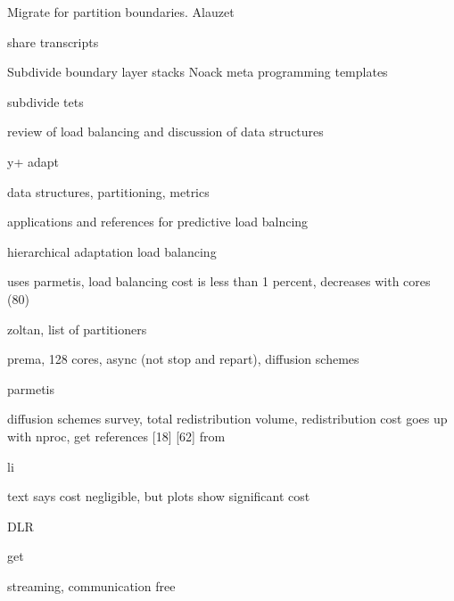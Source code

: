 \documentclass{article}
\begin{document}
Migrate for partition boundaries. 
Alauzet\cite{alauzet-li-seol-shephard-para-aniso}
\cite{kallinderis-load-balance}
\cite{lepage}
\cite{cavallo-para-adapt}
\cite{cavallo-phd-thesis}

share transcripts
\cite{park-darmofal-parallel-aniso-adapt-aiaa}
\cite{park-phd-thesis}

Subdivide boundary layer stacks
\cite{rpi-ec-2008-adapt-bl-visc}
\cite{kallinderis-adapt}
\cite{mavriplis-3d-adapt-mixed-subdivision}
\cite{lapage-habashi-3d-aniso-2002}
\cite{cavallo-phd-thesis}
\cite{kim-nakahashi-adjoint-adapt-viscous}
Noack meta programming templates\cite{noack-unstruct-mixed-adapt-template}

subdivide tets
\cite{rausch-unsteady-adaptation-3d}
\cite{waltz:2003}

review of load balancing and discussion of data structures
\cite{kallinderis-kavouklis-adapt-3d-hybrid,%
      kavouklis-kallinderis-parallel-3d-hybrid-adapt}

y+ adapt\cite{knopp-alrutz-schwambor-adapt-grid-wall-func-rans}

data structures, partitioning, metrics
\cite{flaherty-parallel-data-structures}

applications and references for predictive load balncing
\cite{dindar-shephard-flaherty-adapt-rotorcraft-tc-rotor}

hierarchical adaptation\cite{kallinderis-parallel}
load balancing\cite{minyard-kallinderis-load-balance}

uses parmetis, load balancing cost is less than 1 percent, decreases with cores (80)
\cite{eccomas-2010-para-perf-adapt}

zoltan, list of partitioners
\cite{devine-anm-2005-zoltan-load-balancing}

prema, 128 cores, async (not stop and repart), diffusion schemes
\cite{chrisochoides-ieee-tpds-2004-load-balance}

parmetis
\cite{parmetis-sc-2000}

diffusion schemes survey, total redistribution volume, redistribution cost goes up with nproc,
get references [18] [62] from
\cite{oliker-thesis}

li
\cite{li-masters-thesis,li-load-balance}

text says cost negligible, but plots show significant cost
\cite{park-para-unsteady-adapt}

DLR\cite{tau-para-adapt-hybrid-eccomas}

get
\cite{selwood}

streaming, communication free\cite{pebay-parallel-adapt}




\end{document}
